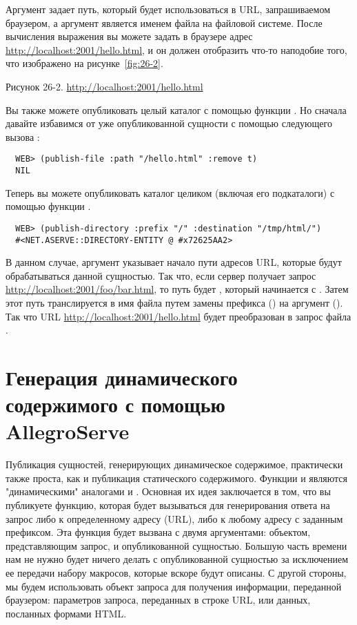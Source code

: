 Аргумент  задает путь, который будет использоваться в URL, запрашиваемом
браузером, а аргумент  является именем файла на файловой системе. После
вычисления выражения  вы можете задать в браузере адрес
\url{http://localhost:2001/hello.html}, и он должен отобразить что-то наподобие того, что
изображено на рисунке~\ref{fig:26-2}.

Рисунок 26-2. \url{http://localhost:2001/hello.html}

Вы также можете опубликовать целый каталог с помощью функции . Но
сначала давайте избавимся от уже опубликованной сущности с помощью следующего вызова
:

\begin{lstlisting}
  WEB> (publish-file :path "/hello.html" :remove t)
  NIL
\end{lstlisting}

Теперь вы можете опубликовать каталог  целиком (включая его подкаталоги)
с помощью функции .

\begin{lstlisting}
  WEB> (publish-directory :prefix "/" :destination "/tmp/html/")
  #<NET.ASERVE::DIRECTORY-ENTITY @ #x72625AA2>
\end{lstlisting}

В данном случае, аргумент  указывает начало пути адресов URL, которые будут
обрабатываться данной сущностью. Так что, если сервер получает запрос
\url{http://localhost:2001/foo/bar.html}, то путь будет , который
начинается с \code{/}. Затем этот путь транслируется в имя файла путем замены префикса
(\code{/}) на аргумент  (). Так что URL
\url{http://localhost:2001/hello.html} будет преобразован в запрос файла
.

\section{Генерация динамического содержимого с помощью AllegroServe}

Публикация сущностей, генерирующих динамическое содержимое, практически также проста, как
и публикация статического содержимого. Функции  и 
являются "динамическими" аналогами  и
. Основная их идея заключается в том, что вы публикуете функцию,
которая будет вызываться для генерирования ответа на запрос либо к определенному адресу
(URL), либо к любому адресу с заданным префиксом. Эта функция будет вызвана с двумя
аргументами: объектом, представляющим запрос, и опубликованной сущностью. Большую часть
времени нам не нужно будет ничего делать с опубликованной сущностью за исключением ее
передачи набору макросов, которые вскоре будут описаны. С другой стороны, мы будем
использовать объект запроса для получения информации, переданной браузером: параметров
запроса, переданных в строке URL, или данных, посланных формами HTML.

